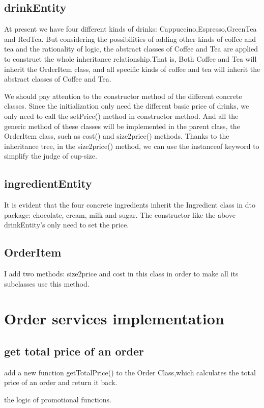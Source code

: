 \documentclass[a4paper]{report}
\begin{document}
\subsection{drinkEntity}
\par At present we have four different kinds of drinks: Cappuccino,Espresso,GreenTea and RedTea. But considering the possibilities of adding other kinds of coffee and tea and the rationality of logic, the abstract classes of Coffee and Tea are applied to construct the whole inheritance relationship.That is, Both Coffee and Tea will inherit the OrderItem class, and all specific kinds of coffee and tea will inherit the abstract classes of Coffee and Tea.
\par We should pay attention to the constructor method of the different concrete classes. Since the initialization only need the different basic price of drinks, we only need to call the setPrice() method in constructor method. And all the generic method of these classes will be implemented in the parent class, the OrderItem class, such as cost() and size2price() methods.
Thanks to the inheritance tree, in the size2price() method, we can use the instanceof keyword to simplify the judge of cup-size.
\subsection{ingredientEntity}
It is evident that the four concrete ingredients inherit the Ingredient class in dto package: chocolate, cream, milk and sugar. The constructor like the above drinkEntity's only need to set the price. 
\subsection{OrderItem}
 I add two methods: size2price and cost in this class in order to make all its subclasses use this method.



\section{Order services implementation}
\subsection{get total price of an order}
add a new function getTotalPrice() to the Order Class,which calculates the total price of an order and return it back. 
\par the logic of promotional functions.
\end{document}
